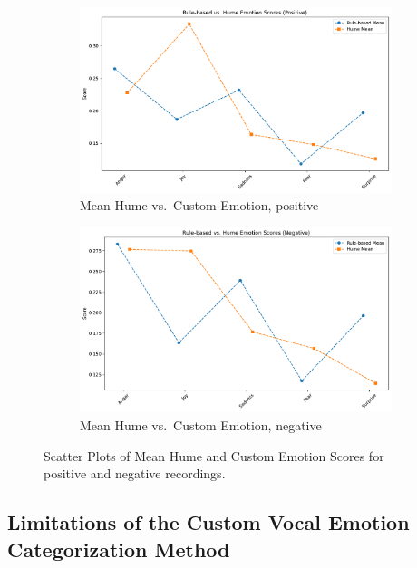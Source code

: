 \begin{figure}[H]
  \centering
  \begin{subfigure}[b]{0.48\textwidth}
    \centering
    \includegraphics[width=\textwidth]{png/results/rq1_nr3/praat_hume_positive_scatter.pdf}
    \caption{Mean Hume vs.\ Custom Emotion, positive}
    \label{fig:rq1_scatter_custom_hume_pos}
  \end{subfigure}
  \hfill
  \begin{subfigure}[b]{0.48\textwidth}
    \centering
    \includegraphics[width=\textwidth]{png/results/rq1_nr3/praat_hume_negative_scatter.pdf}
    \caption{Mean Hume vs.\ Custom Emotion, negative}
    \label{fig:rq1_scatter_custom_hume_neg}
  \end{subfigure}
  \caption{Scatter Plots of Mean Hume and Custom Emotion Scores for positive and negative recordings.}
  \label{fig:rq1_scatter_custom_hume}
\end{figure}

\subsection{Limitations of the Custom Vocal Emotion Categorization Method}

